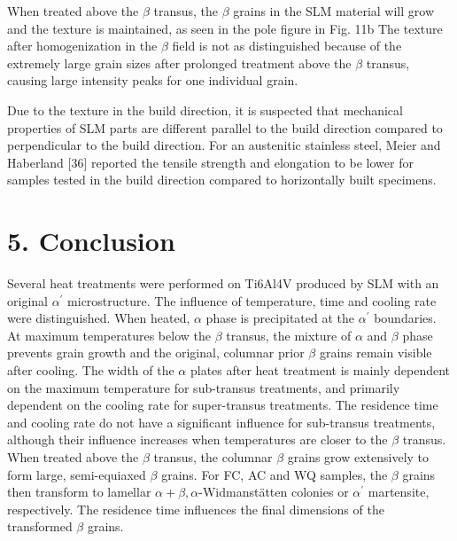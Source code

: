 \documentclass[10pt]{article}
\begin{document}
When treated above the $\beta$ transus, the $\beta$ grains in the SLM material will grow and the texture is maintained, as seen in the pole figure in Fig. 11b The texture after homogenization in the $\beta$ field is not as distinguished because of the extremely large grain sizes after prolonged treatment above the $\beta$ transus, causing large intensity peaks for one individual grain.

Due to the texture in the build direction, it is suspected that mechanical properties of SLM parts are different parallel to the build direction compared to perpendicular to the build direction. For an austenitic stainless steel, Meier and Haberland [36] reported the tensile strength and elongation to be lower for samples tested in the build direction compared to horizontally built specimens.

\section*{5. Conclusion}
Several heat treatments were performed on Ti6Al4V produced by SLM with an original $\alpha^{\prime}$ microstructure. The influence of temperature, time and cooling rate were distinguished. When heated, $\alpha$ phase is precipitated at the $\alpha^{\prime}$ boundaries. At maximum temperatures below the $\beta$ transus, the mixture of $\alpha$ and $\beta$ phase prevents grain growth and the original, columnar prior $\beta$ grains remain visible after cooling. The width of the $\alpha$ plates after heat treatment is mainly dependent on the maximum temperature for sub-transus treatments, and primarily dependent on the cooling rate for super-transus treatments. The residence time and cooling rate do not have a significant influence for sub-transus treatments, although their influence increases when temperatures are closer to the $\beta$ transus. When treated above the $\beta$ transus, the columnar $\beta$ grains grow extensively to form large, semi-equiaxed $\beta$ grains. For FC, AC and WQ samples, the $\beta$ grains then transform to lamellar $\alpha+\beta, \alpha$-Widmanstätten colonies or $\alpha^{\prime}$ martensite, respectively. The residence time influences the final dimensions of the transformed $\beta$ grains.
\end{document}
